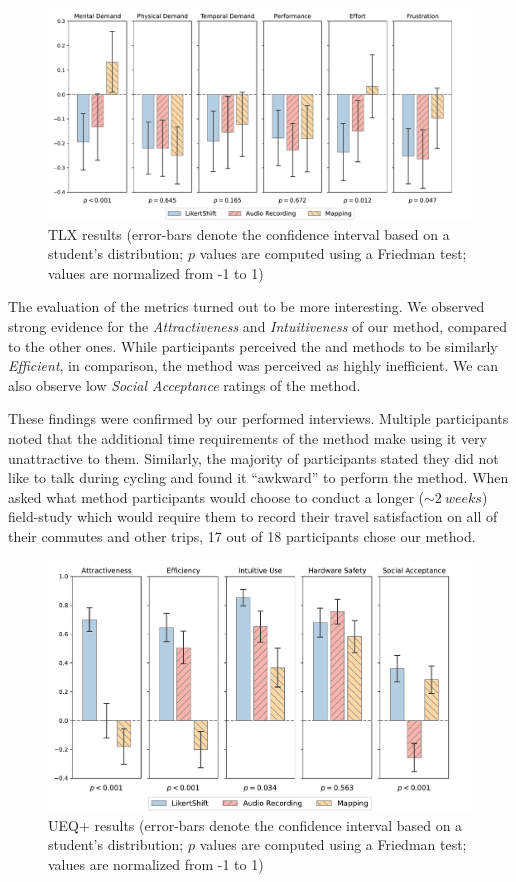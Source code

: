 \begin{figure}[!htb]
    \centering
    \includegraphics[height=0.5\linewidth]{../evaluation/eval_tlx.pdf}
    \caption{TLX results (error-bars denote the confidence interval based on a student's distribution; $p$ values are computed using a Friedman test; values are normalized from -1 to 1)}
    \label{fig:eval_tlx}
\end{figure}

\bigbreak\noindent
The evaluation of the  metrics turned out to be more interesting.
We observed strong evidence for the \textit{Attractiveness} and \textit{Intuitiveness} of our \likertshift method, compared to the other ones.
While participants perceived the \likertshift and \audiorecording methods to be similarly \textit{Efficient}, in comparison, the \mapping method was perceived as highly inefficient.
We can also observe low \textit{Social Acceptance} ratings of the \audiorecording method.

These findings were confirmed by our performed interviews.
Multiple participants noted that the additional time requirements of the \mapping method make using it very unattractive to them.
Similarly, the majority of participants stated they did not like to talk during cycling and found it “awkward” to perform the \audiorecording method.
When asked what method participants would choose to conduct a longer ($\sim\SI{2}{weeks}$) field-study which would require them to record their travel satisfaction on all of their commutes and other trips, 17 out of 18 participants chose our \likertshift method.

\begin{figure}[!htb]
    \centering
    \includegraphics[height=0.5\linewidth]{../evaluation/eval_ueq.pdf}
    \caption{UEQ+ results (error-bars denote the confidence interval based on a student's distribution; $p$ values are computed using a Friedman test; values are normalized from -1 to 1)}
    \label{fig:eval_ueq}
\end{figure}
